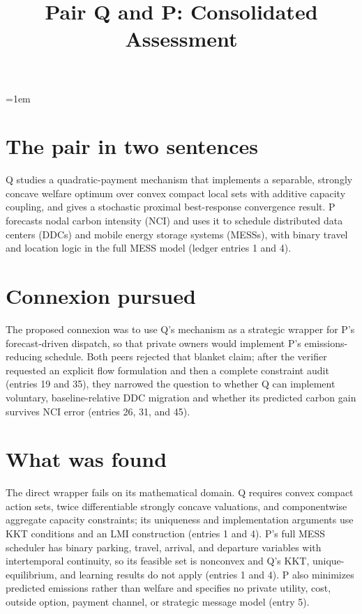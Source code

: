 \documentclass{article}
\title{Pair Q and P: Consolidated Assessment}
\author{}
\date{}
\begin{document}
\emergencystretch=1em
\maketitle

\section*{The pair in two sentences}
Q studies a quadratic-payment mechanism that implements a separable, strongly concave welfare optimum over convex compact local sets with additive capacity coupling, and gives a stochastic proximal best-response convergence result. P forecasts nodal carbon intensity (NCI) and uses it to schedule distributed data centers (DDCs) and mobile energy storage systems (MESSs), with binary travel and location logic in the full MESS model (ledger entries 1 and 4).

\section*{Connexion pursued}
The proposed connexion was to use Q's mechanism as a strategic wrapper for P's forecast-driven dispatch, so that private owners would implement P's emissions-reducing schedule. Both peers rejected that blanket claim; after the verifier requested an explicit flow formulation and then a complete constraint audit (entries 19 and 35), they narrowed the question to whether Q can implement voluntary, baseline-relative DDC migration and whether its predicted carbon gain survives NCI error (entries 26, 31, and 45).

\section*{What was found}
The direct wrapper fails on its mathematical domain. Q requires convex compact action sets, twice differentiable strongly concave valuations, and componentwise aggregate capacity constraints; its uniqueness and implementation arguments use KKT conditions and an LMI construction (entries 1 and 4). P's full MESS scheduler has binary parking, travel, arrival, and departure variables with intertemporal continuity, so its feasible set is nonconvex and Q's KKT, unique-equilibrium, and learning results do not apply (entries 1 and 4). P also minimizes predicted emissions rather than welfare and specifies no private utility, cost, outside option, payment channel, or strategic message model (entry 5).
\end{document}
